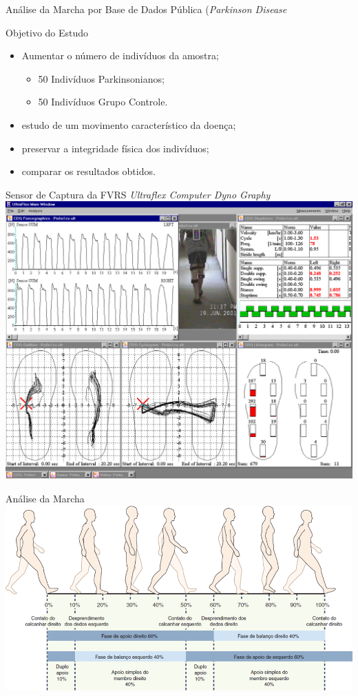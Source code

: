 \documentclass{beamer}
\begin{document}
\begin{frame}{Análise da Marcha por Base de Dados Pública (\textit{Parkinson Disease}~\cite{physionet}}
  \begin{block}{Objetivo do Estudo}
      \begin{itemize}[<+->]
				\item Aumentar o número de indivíduos da amostra;
						\begin{itemize}
							\item 50 Indivíduos Parkinsonianos;
							\item 50 Indivíduos Grupo Controle.
						\end{itemize}
				\item estudo de um movimento característico da doença;
				\item preservar a integridade física dos indivíduos;
				\item comparar os resultados obtidos.
			\end{itemize}
  \end{block}
\end{frame}

\begin{frame}{Sensor de Captura da FVRS \textit{Ultraflex Computer Dyno Graphy}}
      \center \includegraphics[height=2.8 in]{img/ultraflexdinografia.png}
\end{frame}

\begin{frame}{Análise da Marcha~\cite{neumann2012cinesiologia}}
      \center \includegraphics[height=2.2 in]{img/analisemarcha.png}			
\end{frame}
\end{document}
